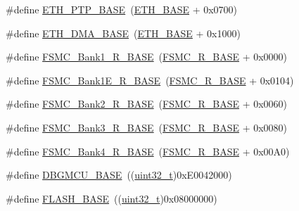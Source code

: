\begin{DoxyCompactItemize}
\item 
\#define \hyperlink{group___peripheral__memory__map_gaa0f60b922aeb7275c785cbaa8f94ecf0}{E\+T\+H\+\_\+\+P\+T\+P\+\_\+\+B\+A\+SE}~(\hyperlink{group___peripheral__memory__map_gad965a7b1106ece575ed3da10c45c65cc}{E\+T\+H\+\_\+\+B\+A\+SE} + 0x0700)
\item 
\#define \hyperlink{group___peripheral__memory__map_gace2114e1b37c1ba88d60f3e831b67e93}{E\+T\+H\+\_\+\+D\+M\+A\+\_\+\+B\+A\+SE}~(\hyperlink{group___peripheral__memory__map_gad965a7b1106ece575ed3da10c45c65cc}{E\+T\+H\+\_\+\+B\+A\+SE} + 0x1000)
\item 
\#define \hyperlink{group___peripheral__memory__map_gad196fe6f5e4041b201d14f43508c06d2}{F\+S\+M\+C\+\_\+\+Bank1\+\_\+\+R\+\_\+\+B\+A\+SE}~(\hyperlink{openmotestm_2library_2inc_2stm32f10x__map_8h_addf0e199dccba83272b20c9fb4d3aaed}{F\+S\+M\+C\+\_\+\+R\+\_\+\+B\+A\+SE} + 0x0000)
\item 
\#define \hyperlink{group___peripheral__memory__map_gaea182589c84aee30b7f735474d8774e2}{F\+S\+M\+C\+\_\+\+Bank1\+E\+\_\+\+R\+\_\+\+B\+A\+SE}~(\hyperlink{openmotestm_2library_2inc_2stm32f10x__map_8h_addf0e199dccba83272b20c9fb4d3aaed}{F\+S\+M\+C\+\_\+\+R\+\_\+\+B\+A\+SE} + 0x0104)
\item 
\#define \hyperlink{group___peripheral__memory__map_ga3cb46d62f4f6458e186a5a4c753e4918}{F\+S\+M\+C\+\_\+\+Bank2\+\_\+\+R\+\_\+\+B\+A\+SE}~(\hyperlink{openmotestm_2library_2inc_2stm32f10x__map_8h_addf0e199dccba83272b20c9fb4d3aaed}{F\+S\+M\+C\+\_\+\+R\+\_\+\+B\+A\+SE} + 0x0060)
\item 
\#define \hyperlink{group___peripheral__memory__map_gacf056152c9e5aefcc67db78d1302c0d7}{F\+S\+M\+C\+\_\+\+Bank3\+\_\+\+R\+\_\+\+B\+A\+SE}~(\hyperlink{openmotestm_2library_2inc_2stm32f10x__map_8h_addf0e199dccba83272b20c9fb4d3aaed}{F\+S\+M\+C\+\_\+\+R\+\_\+\+B\+A\+SE} + 0x0080)
\item 
\#define \hyperlink{group___peripheral__memory__map_gaf9e5417133160b0bdd0498d982acec19}{F\+S\+M\+C\+\_\+\+Bank4\+\_\+\+R\+\_\+\+B\+A\+SE}~(\hyperlink{openmotestm_2library_2inc_2stm32f10x__map_8h_addf0e199dccba83272b20c9fb4d3aaed}{F\+S\+M\+C\+\_\+\+R\+\_\+\+B\+A\+SE} + 0x00\+A0)
\item 
\#define \hyperlink{group___peripheral__memory__map_ga4adaf4fd82ccc3a538f1f27a70cdbbef}{D\+B\+G\+M\+C\+U\+\_\+\+B\+A\+SE}~((\hyperlink{_p_e___types_8h_a33594304e786b158f3fb30289278f5af}{uint32\+\_\+t})0x\+E0042000)
\item 
\#define \hyperlink{group___peripheral__memory__map_ga23a9099a5f8fc9c6e253c0eecb2be8db}{F\+L\+A\+S\+H\+\_\+\+B\+A\+SE}~((\hyperlink{_p_e___types_8h_a33594304e786b158f3fb30289278f5af}{uint32\+\_\+t})0x08000000)

\end{DoxyCompactItemize}
